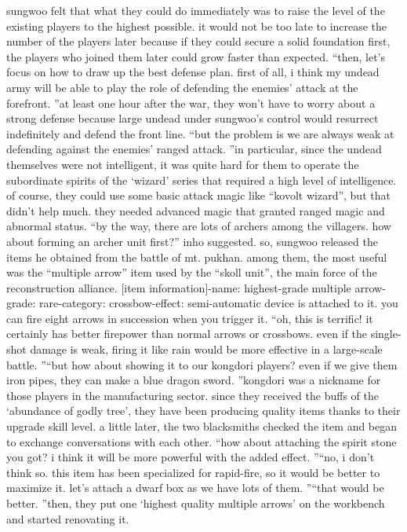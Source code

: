sungwoo felt that what they could do immediately was to raise the level of the existing players to the highest possible.
it would not be too late to increase the number of the players later because if they could secure a solid foundation first, the players who joined them later could grow faster than expected.
“then, let’s focus on how to draw up the best defense plan.
 first of all, i think my undead army will be able to play the role of defending the enemies’ attack at the forefront.
”at least one hour after the war, they won’t have to worry about a strong defense because large undead under sungwoo’s control would resurrect indefinitely and defend the front line.
“but the problem is we are always weak at defending against the enemies’ ranged attack.
”in particular, since the undead themselves were not intelligent, it was quite hard for them to operate the subordinate spirits of the ‘wizard’ series that required a high level of intelligence.
of course, they could use some basic attack magic like “kovolt wizard”, but that didn’t help much.
 they needed advanced magic that granted ranged magic and abnormal status.
“by the way, there are lots of archers among the villagers.
 how about forming an archer unit first?” inho suggested.
so, sungwoo released the items he obtained from the battle of mt.
 pukhan.
among them, the most useful was the “multiple arrow” item used by the “skoll unit”, the main force of the reconstruction alliance.
[item information]-name: highest-grade multiple arrow-grade: rare-category: crossbow-effect: semi-automatic device is attached to it.
 you can fire eight arrows in succession when you trigger it.
“oh, this is terrific! it certainly has better firepower than normal arrows or crossbows.
 even if the single-shot damage is weak, firing it like rain would be more effective in a large-scale battle.
”“but how about showing it to our kongdori players? even if we give them iron pipes, they can make a blue dragon sword.
”kongdori was a nickname for those players in the manufacturing sector.
 since they received the buffs of the ‘abundance of godly tree’, they have been producing quality items thanks to their upgrade skill level.
a little later, the two blacksmiths checked the item and began to exchange conversations with each other.
“how about attaching the spirit stone you got? i think it will be more powerful with the added effect.
”“no, i don’t think so.
 this item has been specialized for rapid-fire, so it would be better to maximize it.
 let’s attach a dwarf box as we have lots of them.
”“that would be better.
”then, they put one ‘highest quality multiple arrows’ on the workbench and started renovating it.
